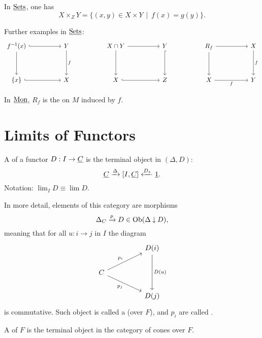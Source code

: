\begin{examples*}
	\item In \( \underline{\mathrm{Sets}} \), one has
		\[
			X \times_Z Y = \{(x, y) \in X \times Y \,\mid\, f(x) = g(y)\}.
		\]
	\item Further examples in \( \underline{\mathrm{Sets}} \):
		\[
			\begin{tikzcd}[column sep = 9mm]
				{f^{-1}(x)} && Y && {X \cap Y} && Y && {R_f} && X \\
				\\
				{\{x\}} && X && X && Z && X && Y
				\arrow[hook, from=1-1, to=1-3]
				\arrow[from=1-1, to=3-1]
				\arrow["f", from=1-3, to=3-3]
				\arrow[from=1-5, to=1-7]
				\arrow[from=1-5, to=3-5]
				\arrow[hook, from=1-7, to=3-7]
				\arrow[from=1-9, to=1-11]
				\arrow[from=1-9, to=3-9]
				\arrow["f", from=1-11, to=3-11]
				\arrow[hook, from=3-1, to=3-3]
				\arrow[hook, from=3-5, to=3-7]
				\arrow["f"', from=3-9, to=3-11]
			\end{tikzcd}
		\]
	\item In \( \underline{\mathrm{Mon}} \), \( R_f \) is the  on \( M \) induced by \( f \).
\end{examples*}

\section{Limits of Functors}

\begin{definition*}
	A  of a functor \( D: I \to \underline{C} \) is the terminal object in \( (\Delta \comma D) \):
	\[
		\underline{C} \xrightarrow{\Delta} [I, \underline{C}] \xleftarrow{D_*} \underline{\mathrm{1}}.
	\]
	Notation: \( \lim_I D \equiv \lim D \).
\end{definition*}

In more detail, elements of this category are morphisms
\[
	\Delta_C \xrightarrow{p} D \in \operatorname{Ob}(\Delta \mathbin{\downarrow} D),
\]
meaning that for all \( u: i \to j \) in \( I \) the diagram
\[
	\begin{tikzcd}
		&& {D(i)} \\
		C \\
		&& {D(j)}
		\arrow["{D(u)}", from=1-3, to=3-3]
		\arrow["{p_i}", from=2-1, to=1-3]
		\arrow["{p_j}"', from=2-1, to=3-3]
	\end{tikzcd}
\]
is commutative. Such object is called a  (over \( F \)), and \( p_i \) are called .

\begin{definition*}[Alternative]
	A  of \( F \) is the terminal object in the category of cones over \( F \).
\end{definition*}

